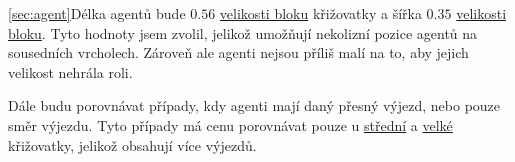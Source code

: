 \ref{sec:agent}Délka agentů bude $0.56$ \hyperref[par:velikost_bloku]{velikosti bloku} křižovatky
a šířka $0.35$ \hyperref[par:velikost_bloku]{velikosti bloku}.
Tyto hodnoty jsem zvolil, jelikož umožňují nekolizní pozice agentů na sousedních vrcholech.
Zároveň ale agenti nejsou příliš malí na to, aby jejich velikost nehrála roli.

Dále budu porovnávat případy, kdy agenti mají daný přesný výjezd, nebo pouze směr výjezdu.
Tyto případy má cenu porovnávat pouze u \hyperref[par:data_stredni]{střední} a
\hyperref[par:data_velka]{velké} křižovatky, jelikož obsahují více výjezdů.
